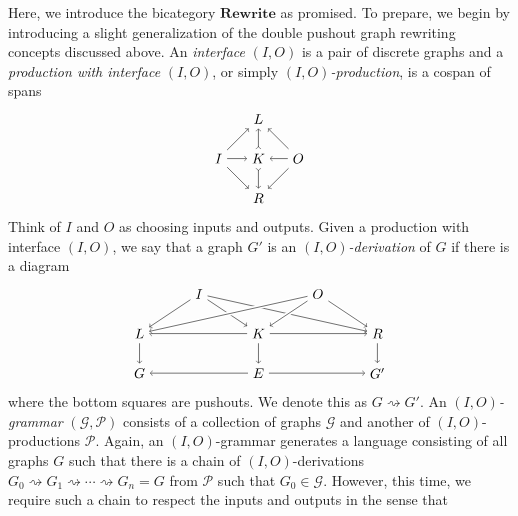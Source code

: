 \documentclass{tac}
\newcommand{\cat}[1]{\mathbf{#1}}
\begin{document}
Here, we introduce the bicategory $\cat{Rewrite}$ as promised.  
To prepare, we begin by introducing a slight generalization 
of the double pushout graph rewriting concepts discussed above.  
An \emph{interface} $(I,O)$ is a pair of discrete graphs and a 
\emph{production with interface} $(I,O)$, or simply \emph{$(I,O)$-production}, 
is a cospan of spans
\[
\begin{tikzpicture}
\node (I) at (-1,0) {$I$};
\node (O) at (1,0) {$O$};
\node (L) at (0,1) {$L$};
\node (K) at (0,0) {$K$};
\node (R) at (0,-1) {$R$};
%
\draw [->] (I) edge (L);
\draw [->] (I) edge (K);
\draw [->] (I) edge (R);
\draw [->] (O) edge (L);
\draw [->] (O) edge (K);
\draw [->] (O) edge (R);
\draw [>->] (K) edge (L);
\draw [>->] (K) edge (R);
\end{tikzpicture}
\]
Think of $I$ and $O$ as choosing inputs and outputs. 
Given a production with interface $(I,O)$, we say that a graph $G'$ is an 
\emph{$(I,O)$-derivation} of $G$ if there is a diagram
\[
	\begin{tikzpicture}
	\node (I) at (1.5,2) {$I$};
	\node (O) at (4.5,2) {$O$};
	\node (L) at (0,1) {$L$};
	\node (K) at (3,1) {$K$};
	\node (R) at (6,1) {$R$};
	\node (G) at (0,0) {$G$};
	\node (E) at (3,0) {$E$};
	\node (G') at (6,0) {$G'$};
	\draw [->] (I) edge (L);
	\draw [->] (I) edge (K);
	\draw [->] (I) edge (R);
	\draw [->] (K) edge (L);
	\draw [->] (K) edge (E);
	\draw [->] (K) edge (R);
	\draw [->] (L) edge (G);
	\draw [->] (R) edge (G');
	\draw [->] (E) edge (G);
	\draw [->] (E) edge (G');
	\draw [-] (O) edge[white,line width=3pt] (L);
	\draw [->] (O) edge (L);
	\draw [-] (O) edge[white,line width=3pt] (K);
	\draw [->] (O) edge (K);
	\draw [-] (O) edge[white,line width=3pt] (R);
	\draw [->] (O) edge (R);
	\end{tikzpicture}
\]
where the bottom squares are pushouts. We denote this as $G \rightsquigarrow G'$. 
An \emph{$(I,O)$-grammar} 
	$(\mathcal{G},\mathcal{P})$ 
consists of a collection of graphs $\mathcal{G}$ 
and another of $(I,O)$-productions $\mathcal{P}$. 
Again, an $(I,O)$-grammar generates a language 
consisting of all graphs $G$ such that there is a chain of $(I,O)$-derivations 
	$G_0 \rightsquigarrow 
		G_1 \rightsquigarrow \dotsm \rightsquigarrow 
		G_n=G$ 
from $\mathcal{P}$ such that $G_0 \in \mathcal{G}$. 
However, this time, we require such a chain to respect 
the inputs and outputs in the sense that 
\end{document}
